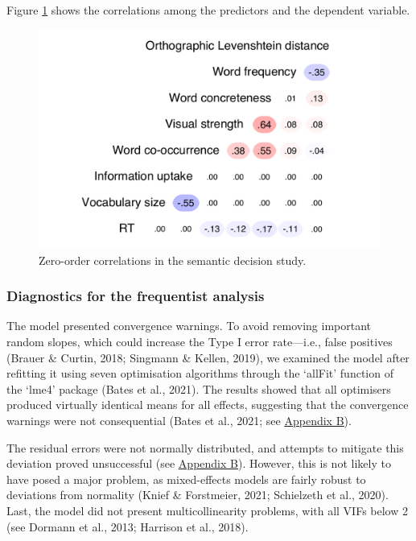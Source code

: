 \documentclass[
  12pt,
  man,floatsintext]{apa7}
\begin{document}
Figure \ref{fig:semanticdecision-correlations} shows the correlations among the predictors and the dependent variable.

\begin{figure}

{\centering \includegraphics[width=0.61\linewidth]{thesis-core_files/figure-latex/semanticdecision-correlations-1} 

}

\caption{Zero-order correlations in the semantic decision study.}\label{fig:semanticdecision-correlations}
\end{figure}

\hypertarget{diagnostics-for-the-frequentist-analysis-2}{%
\subsubsection{Diagnostics for the frequentist analysis}\label{diagnostics-for-the-frequentist-analysis-2}}

The model presented convergence warnings. To avoid removing important random slopes, which could increase the Type I error rate---i.e., false positives (Brauer \& Curtin, 2018; Singmann \& Kellen, 2019), we examined the model after refitting it using seven optimisation algorithms through the `allFit' function of the `lme4' package (Bates et al., 2021). The results showed that all optimisers produced virtually identical means for all effects, suggesting that the convergence warnings were not consequential (Bates et al., 2021; see \protect\hyperlink{appendix-B-frequentist-analysis-diagnostics}{\underline{Appendix B}}).

The residual errors were not normally distributed, and attempts to mitigate this deviation proved unsuccessful (see \protect\hyperlink{appendix-B-frequentist-analysis-diagnostics}{\underline{Appendix B}}). However, this is not likely to have posed a major problem, as mixed-effects models are fairly robust to deviations from normality (Knief \& Forstmeier, 2021; Schielzeth et al., 2020). Last, the model did not present multicollinearity problems, with all VIFs below 2 (see Dormann et al., 2013; Harrison et al., 2018).
\end{document}
